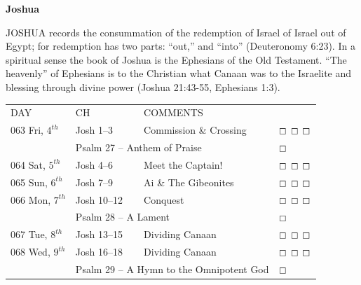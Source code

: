 \documentclass[10pt,landscape,twocolumn,letterpaper]{article}
\begin{document}
\begin{center}
\textbf{Joshua}
\end{center}
JOSHUA records the consummation of the redemption of Israel of Israel out of Egypt; for redemption has two parts: ``out,'' and ``into'' (Deuteronomy 6:23). In a spiritual sense the book of Joshua is the Ephesians of the Old Testament. ``The heavenly'' of Ephesians is to the Christian what Canaan was to the Israelite and blessing through divine power (Joshua 21:43-55, Ephesians 1:3). 
 
\begin{tabular}{p{0.75in}p{0.65in}p{1.8in}p{0.55in}}
  DAY & CH & COMMENTS &  \\
\tiny 063 \normalsize \textcolor[rgb]{0.00,0.00,1.00}{Fri, $4^{th}$} & \textcolor[rgb]{0.00,0.00,1.00}{Josh 1--3} & \textcolor[rgb]{0.50,0.50,0.50}{\small Commission  \& Crossing} & $\boxempty$ $\boxempty$ $\boxempty$\\
     & \multicolumn{2}{l}{\textcolor[rgb]{1.00,0.00,0.00}{Psalm 27 -- Anthem of Praise}} & $\boxempty$ \\

\tiny 064 \normalsize \textcolor[rgb]{0.00,0.00,1.00}{Sat, $5^{th}$} & \textcolor[rgb]{0.00,0.00,1.00}{Josh 4--6} & \textcolor[rgb]{0.50,0.50,0.50}{\small Meet the Captain!} & $\boxempty$ $\boxempty$ $\boxempty$\\

\tiny 065 \normalsize \textcolor[rgb]{0.00,0.00,1.00}{Sun, $6^{th}$} & \textcolor[rgb]{0.00,0.00,1.00}{Josh 7--9} & \textcolor[rgb]{0.50,0.50,0.50}{\small Ai \& The Gibeonites} &  $\boxempty$ $\boxempty$ $\boxempty$\\

\tiny 066 \normalsize \textcolor[rgb]{0.00,0.00,1.00}{Mon, $7^{th}$} & \textcolor[rgb]{0.00,0.00,1.00}{Josh 10--12} & \textcolor[rgb]{0.50,0.50,0.50}{\small Conquest} & $\boxempty$ $\boxempty$ $\boxempty$\\
     & \multicolumn{2}{l}{\textcolor[rgb]{1.00,0.00,0.00}{Psalm 28 -- A Lament}} & $\boxempty$ \\

\tiny 067 \normalsize \textcolor[rgb]{0.00,0.00,1.00}{Tue, $8^{th}$} & \textcolor[rgb]{0.00,0.00,1.00}{Josh 13--15} & \textcolor[rgb]{0.50,0.50,0.50}{\small Dividing Canaan} & $\boxempty$ $\boxempty$ $\boxempty$\\

\tiny 068 \normalsize \textcolor[rgb]{0.00,0.00,1.00}{Wed, $9^{th}$} & \textcolor[rgb]{0.00,0.00,1.00}{Josh 16--18} & \textcolor[rgb]{0.50,0.50,0.50}{\small Dividing Canaan} &  $\boxempty$ $\boxempty$ $\boxempty$\\
     & \multicolumn{2}{l}{\textcolor[rgb]{1.00,0.00,0.00}{Psalm 29 -- A Hymn to the Omnipotent God}} & $\boxempty$ \\


\end{tabular}
\end{document}
